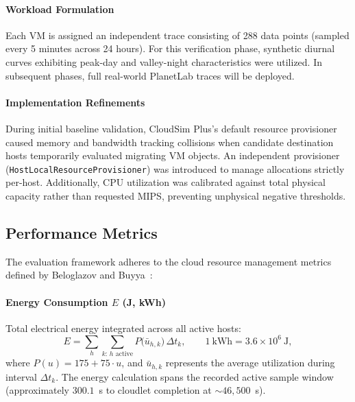 \documentclass[11pt,a4paper]{article}
\begin{document}
\paragraph{Workload Formulation} Each VM is assigned an independent trace consisting of 288 data points (sampled every 5 minutes across 24 hours). For this verification phase, synthetic diurnal curves exhibiting peak-day and valley-night characteristics were utilized. In subsequent phases, full real-world PlanetLab traces will be deployed.

\paragraph{Implementation Refinements}
During initial baseline validation, CloudSim Plus's default resource provisioner caused memory and bandwidth tracking collisions when candidate destination hosts temporarily evaluated migrating VM objects. An independent provisioner (\texttt{HostLocalResourceProvisioner}) was introduced to manage allocations strictly per-host. Additionally, CPU utilization was calibrated against total physical capacity rather than requested MIPS, preventing unphysical negative thresholds.

\subsection{Performance Metrics}
The evaluation framework adheres to the cloud resource management metrics defined by Beloglazov and Buyya~\cite{beloglazov2012ccpe}:

\paragraph{Energy Consumption $E$ (J, kWh)} Total electrical energy integrated across all active hosts:
\begin{equation}
E = \sum_{h}\sum_{k:\,h \text{ active}} P\big(\bar u_{h,k}\big)\,\Delta t_{k}, \qquad 1~\text{kWh} = 3.6\times10^{6}~\text{J},
\end{equation}
where $P(u) = 175 + 75\cdot u$, and $\bar u_{h,k}$ represents the average utilization during interval $\Delta t_k$. The energy calculation spans the recorded active sample window (approximately $300.1$~s to cloudlet completion at $\sim 46{,}500$~s).
\end{document}
